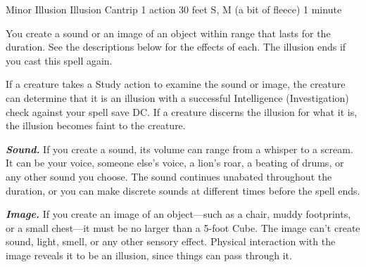 \DndSpellHeader%
    {Minor Illusion}
    {Illusion Cantrip}
    {1 action}
    {30 feet}
    {S, M (a bit of fleece)}
    {1 minute}

You create a sound or an image of an object within range that lasts for the duration. See the descriptions below for the effects of each. The illusion ends if you cast this spell again.

If a creature takes a Study action to examine the sound or image, the creature can determine that it is an illusion with a successful Intelligence (Investigation) check against your spell save DC. If a creature discerns the illusion for what it is, the illusion becomes faint to the creature.

\textbf{\textit{Sound.}} If you create a sound, its volume can range from a whisper to a scream. It can be your voice, someone else's voice, a lion's roar, a beating of drums, or any other sound you choose. The sound continues unabated throughout the duration, or you can make discrete sounds at different times before the spell ends.

\textbf{\textit{Image.}} If you create an image of an object—such as a chair, muddy footprints, or a small chest—it must be no larger than a 5-foot Cube. The image can't create sound, light, smell, or any other sensory effect. Physical interaction with the image reveals it to be an illusion, since things can pass through it.
